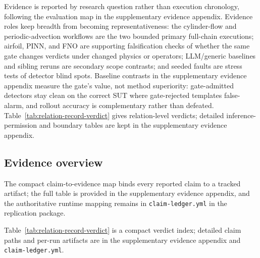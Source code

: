 \documentclass[preprint,12pt,authoryear]{elsarticle}
\begin{document}
Evidence is reported by research question rather than execution chronology, following the evaluation map in the supplementary evidence appendix. Evidence roles keep breadth from becoming representativeness: the cylinder-flow and periodic-advection workflows are the two bounded primary full-chain executions; airfoil, PINN, and FNO are supporting falsification checks of whether the same gate changes verdicts under changed physics or operators; LLM/generic baselines and sibling reruns are secondary scope contrasts; and seeded faults are stress tests of detector blind spots. Baseline contrasts in the supplementary evidence appendix measure the gate's value, not method superiority: gate-admitted detectors stay clean on the correct SUT where gate-rejected templates false-alarm, and rollout accuracy is complementary rather than defeated. Table~\ref{tab:relation-record-verdict} gives relation-level verdicts; detailed inference-permission and boundary tables are kept in the supplementary evidence appendix.

\subsection{Evidence overview}
\label{subsec:claim-evidence-map}

The compact claim-to-evidence map binds every reported claim to a tracked artifact; the full table is provided in the supplementary evidence appendix, and the authoritative runtime mapping remains in \texttt{claim-ledger.yml} in the replication package.

\label{subsec:relation-record-verdict-map}

Table~\ref{tab:relation-record-verdict} is a compact verdict index; detailed claim paths and per-run artifacts are in the supplementary evidence appendix and \texttt{claim-ledger.yml}.
\end{document}
